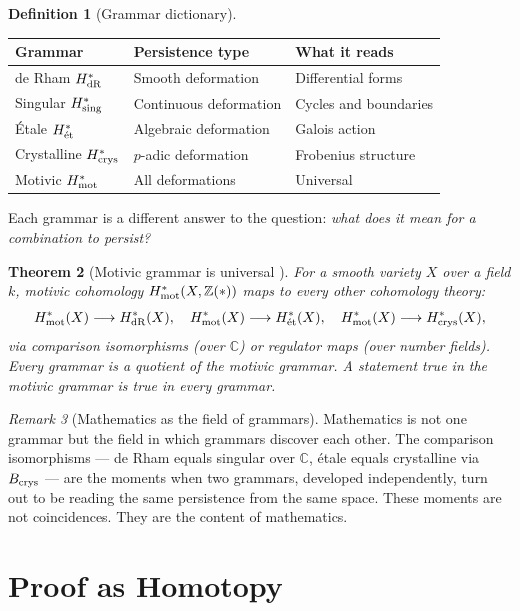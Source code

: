 \documentclass[12pt]{article}
\newtheorem{theorem}{Theorem}
\theoremstyle{definition}
\newtheorem{definition}[theorem]{Definition}
\theoremstyle{remark}
\newtheorem{remark}[theorem]{Remark}
\begin{document}
\begin{definition}[Grammar dictionary]
\hfill
\begin{center}
\begin{tabular}{@{}lll@{}}
\toprule
Grammar & Persistence type & What it reads \\
\midrule
de Rham $H^*_{\rm dR}$ & Smooth deformation & Differential forms \\
Singular $H^*_{\rm sing}$ & Continuous deformation & Cycles and boundaries \\
\'Etale $H^*_{\rm\acute{e}t}$ & Algebraic deformation & Galois action \\
Crystalline $H^*_{\rm crys}$ & $p$-adic deformation & Frobenius structure \\
Motivic $H^*_{\rm mot}$ & All deformations & Universal \\
\bottomrule
\end{tabular}
\end{center}
Each grammar is a different answer to the question:
\emph{what does it mean for a combination to persist?}
\end{definition}

\begin{theorem}[Motivic grammar is universal \cite{motives}]
For a smooth variety $X$ over a field $k$,
motivic cohomology $H^*_{\rm mot}(X, \mathbb{Z}(*))$ maps to every
other cohomology theory:
\[
H^*_{\rm mot}(X) \longrightarrow H^*_{\rm dR}(X),\quad
H^*_{\rm mot}(X) \longrightarrow H^*_{\rm\acute{e}t}(X),\quad
H^*_{\rm mot}(X) \longrightarrow H^*_{\rm crys}(X),
\]
via comparison isomorphisms (over $\mathbb{C}$) or regulator maps
(over number fields). Every grammar is a quotient of the motivic grammar.
A statement true in the motivic grammar is true in every grammar.
\end{theorem}

\begin{remark}[Mathematics as the field of grammars]
Mathematics is not one grammar but the field in which grammars
discover each other.
The comparison isomorphisms --- de Rham equals singular over $\mathbb{C}$,
étale equals crystalline via $B_{\rm crys}$ \cite{perfectoid} ---
are the moments when two grammars, developed independently,
turn out to be reading the same persistence from the same space.
These moments are not coincidences. They are the content of mathematics.
\end{remark}

\section{Proof as Homotopy}
\end{document}
